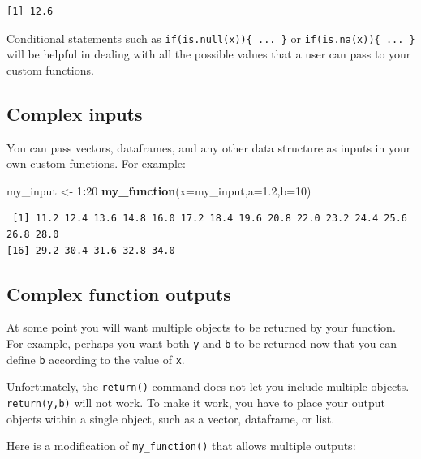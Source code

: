 \documentclass[
]{book}
\newenvironment{Shaded}{\begin{snugshade}}{\end{snugshade}}
\newcommand{\DataTypeTok}[1]{\textcolor[rgb]{0.13,0.29,0.53}{#1}}
\newcommand{\DecValTok}[1]{\textcolor[rgb]{0.00,0.00,0.81}{#1}}
\newcommand{\FloatTok}[1]{\textcolor[rgb]{0.00,0.00,0.81}{#1}}
\newcommand{\KeywordTok}[1]{\textcolor[rgb]{0.13,0.29,0.53}{\textbf{#1}}}
\newcommand{\NormalTok}[1]{#1}
\newcommand{\OperatorTok}[1]{\textcolor[rgb]{0.81,0.36,0.00}{\textbf{#1}}}
\newcommand{\StringTok}[1]{\textcolor[rgb]{0.31,0.60,0.02}{#1}}
\begin{document}
\begin{verbatim}
[1] 12.6
\end{verbatim}

Conditional statements such as \texttt{if(is.null(x))\{\ ...\ \}} or \texttt{if(is.na(x))\{\ ...\ \}} will be helpful in dealing with all the possible values that a user can pass to your custom functions.

\hypertarget{complex-inputs}{%
\subsection*{Complex inputs}\label{complex-inputs}}

You can pass vectors, dataframes, and any other data structure as inputs in your own custom functions. For example:

\begin{Shaded}
\begin{Highlighting}[]
\NormalTok{my_input <-}\StringTok{ }\DecValTok{1}\OperatorTok{:}\DecValTok{20}
\KeywordTok{my_function}\NormalTok{(}\DataTypeTok{x=}\NormalTok{my_input,}\DataTypeTok{a=}\FloatTok{1.2}\NormalTok{,}\DataTypeTok{b=}\DecValTok{10}\NormalTok{)}
\end{Highlighting}
\end{Shaded}

\begin{verbatim}
 [1] 11.2 12.4 13.6 14.8 16.0 17.2 18.4 19.6 20.8 22.0 23.2 24.4 25.6 26.8 28.0
[16] 29.2 30.4 31.6 32.8 34.0
\end{verbatim}

\hypertarget{complex-function-outputs}{%
\subsection*{Complex function outputs}\label{complex-function-outputs}}

At some point you will want multiple objects to be returned by your function. For example, perhaps you want both \texttt{y} and \texttt{b} to be returned now that you can define \texttt{b} according to the value of \texttt{x}.

Unfortunately, the \texttt{return()} command does not let you include multiple objects. \texttt{return(y,b)} will not work. To make it work, you have to place your output objects within a single object, such as a vector, dataframe, or list.

Here is a modification of \texttt{my\_function()} that allows multiple outputs:
\end{document}
